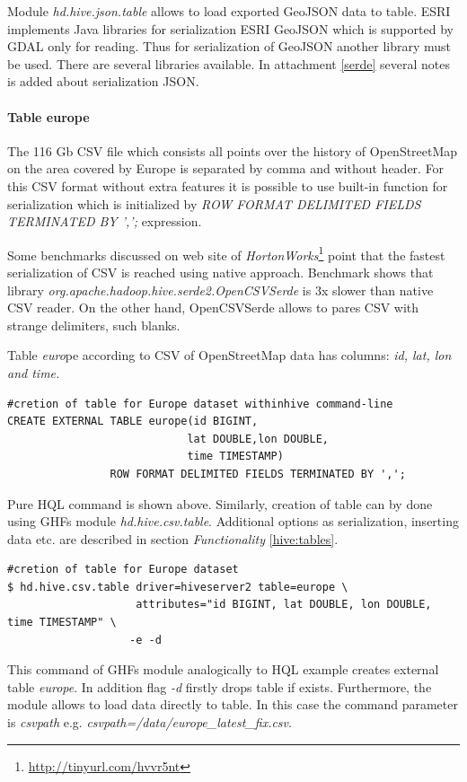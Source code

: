 \documentclass[a4paper,12pt,oneside]{report}
\begin{document}
	
		Module \textit{hd.hive.json.table} allows to load exported GeoJSON data to
	table. ESRI implements Java libraries for serialization ESRI GeoJSON which is
	supported by GDAL only for reading. Thus for serialization of GeoJSON another library must be
	used. There are several libraries available. In attachment \ref{serde} several notes is added about serialization
	JSON.

\paragraph{Table europe}
		The 116 Gb CSV file which consists all points over the history of OpenStreetMap on the area covered by Europe is separated by comma and without header. For this CSV
	format without extra features it is possible to use built-in function for
	serialization which is initialized by \textit{ROW FORMAT DELIMITED FIELDS
	TERMINATED BY ',';} expression.
		
	Some benchmarks discussed on web site of
	\textit{HortonWorks}\footnote{\url{http://tinyurl.com/hvvr5nt}} point that the fastest serialization of CSV is reached using native approach. Benchmark shows
	that library \textit{org.apache.hadoop.hive.serde2.OpenCSVSerde} is 3x slower
	than native CSV reader. On the other hand, OpenCSVSerde allows to pares CSV with
	strange delimiters, such blanks.
		
		
	Table \textit{euro}pe according to CSV of OpenStreetMap data has columns: \textit{id, lat, lon
and time.}
\begin{footnotesize}
	\begin{lstlisting}[style=python]
#cretion of table for Europe dataset withinhive command-line
CREATE EXTERNAL TABLE europe(id BIGINT,
                            lat DOUBLE,lon DOUBLE,
                            time TIMESTAMP)
			    ROW FORMAT DELIMITED FIELDS TERMINATED BY ',';
		\end{lstlisting}
	\end{footnotesize}
	Pure HQL command is shown above. Similarly, creation of table can by done using GHFs
	module \textit{hd.hive.csv.table}. Additional options as serialization,
	inserting data etc. are described in section
	\textit{Functionality} \ref{hive:tables}. 
\begin{footnotesize}
	\begin{lstlisting}[style=python]
#cretion of table for Europe dataset
$ hd.hive.csv.table driver=hiveserver2 table=europe \
                    attributes="id BIGINT, lat DOUBLE, lon DOUBLE, time TIMESTAMP" \
                   -e -d
		\end{lstlisting}
	\end{footnotesize}
	This command of GHFs module analogically to HQL example creates external table
	\textit{europe}. In addition flag \textit{-d} firstly drops table if exists.
	Furthermore, the module allows to load data directly to table. In this case the
	command parameter is \textit{csvpath} e.g. \newline
	\textit{csvpath=/data/europe\_latest\_fix.csv}.
	
\end{document}
